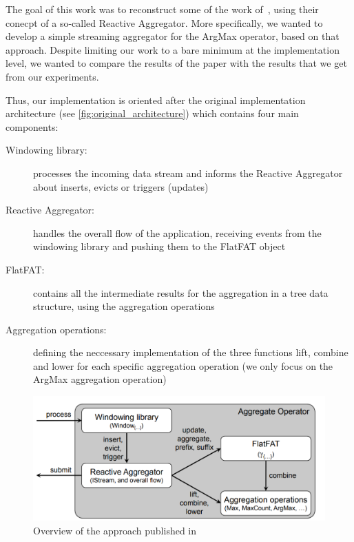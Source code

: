 The goal of this work was to reconstruct some of the work of~\cite{GeneralIncremental15}, using their conecpt of a so-called Reactive Aggregator. More specifically, we wanted to develop a simple streaming aggregator for the ArgMax operator, based on that approach. Despite limiting our work to a bare minimum at the implementation level, we wanted to compare the results of the paper with the results that we get from our experiments.

Thus, our implementation is oriented after the original implementation architecture (see \autoref{fig:original_architecture}) which contains four main components:
\begin{description}
	\item[Windowing library:] processes the incoming data stream and informs the Reactive Aggregator about inserts, evicts or triggers (updates)
	\item[Reactive Aggregator:] handles the overall flow of the application, receiving events from the windowing library and pushing them to the FlatFAT object
	\item[FlatFAT:] contains all the intermediate results for the aggregation in a tree data structure, using the aggregation operations
	\item[Aggregation operations:] defining the neccessary implementation of the three functions lift, combine and lower for each specific aggregation operation (we only focus on the ArgMax aggregation operation)
\end{description}

\begin{figure}[H]
	\centering
	\includegraphics[width=\linewidth]{figures/original_architecture}
	\caption{Overview of the approach published in~\cite{GeneralIncremental15}}
	\label{fig:original_architecture}
\end{figure}